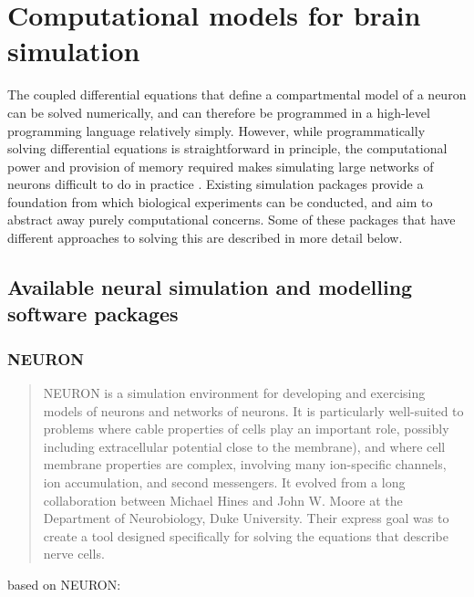 \section{Computational models for brain simulation}

The coupled differential equations that define a compartmental model of a
neuron can be solved numerically, and can therefore be programmed in a
high-level programming language relatively simply. However, while
programmatically solving differential equations is straightforward in principle,
the computational power and provision of memory required makes simulating large
networks of neurons difficult to do in practice \autocite{trappenberg_fundamentals_2009}.
Existing simulation packages provide a foundation from which biological
experiments can be conducted, and aim to abstract away purely computational
concerns. Some of these packages that have different approaches to solving this are described in more detail below. 

\subsection{Available neural simulation and modelling software packages}

\subsubsection{NEURON}
\begin{quote}
    NEURON is a simulation environment for developing and exercising models of
    neurons and networks of neurons. It is particularly well-suited to problems
    where cable properties of cells play an important role, possibly including
    extracellular potential close to the membrane), and where cell membrane
    properties are complex, involving many ion-specific channels, ion
    accumulation, and second messengers. It evolved from a long collaboration
    between Michael Hines and John W. Moore at the Department of Neurobiology,
    Duke University. Their express goal was to create a tool designed
    specifically for solving the equations that describe nerve cells.
\end{quote}
based on NEURON:
\autocite{hagen_lfpy_2019} \autocite{hagen_hybrid_2016}

